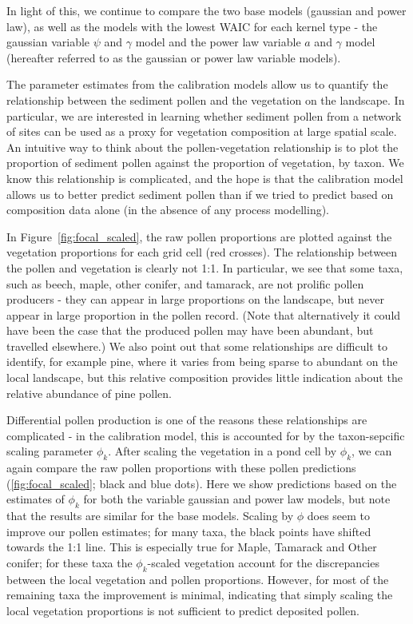 \documentclass[12pt]{article}
\begin{document}
In light of this, we continue to compare the two base models (gaussian
and power law), as well as the models with the lowest WAIC for each
kernel type - the gaussian variable $\psi$ and $\gamma$ model and the
power law variable $a$ and $\gamma$ model (hereafter referred to as
the gaussian or power law variable models).

The parameter estimates from the calibration models allow us to
quantify the relationship between the sediment pollen and the
vegetation on the landscape. In particular, we are interested in
learning whether sediment pollen from a network of sites can be used
as a proxy for vegetation composition at large spatial scale. An
intuitive way to think about the pollen-vegetation relationship is to
plot the proportion of sediment pollen against the proportion of
vegetation, by taxon. We know this relationship is complicated, and
the hope is that the calibration model allows us to better predict
sediment pollen than if we tried to predict based on composition data
alone (in the absence of any process modelling).

In Figure~\ref{fig:focal_scaled}, the raw pollen proportions are
plotted against the vegetation proportions for each grid cell (red
crosses). The relationship between the pollen and vegetation is
clearly not 1:1. In particular, we see that some taxa, such as beech,
maple, other conifer, and tamarack, are not prolific pollen producers
- they can appear in large proportions on the landscape, but never
appear in large proportion in the pollen record. (Note that
alternatively it could have been the case that the produced pollen may
have been abundant, but travelled elsewhere.) We also point out that
some relationships are difficult to identify, for example pine, where
it varies from being sparse to abundant on the local landscape, but
this relative composition provides little indication about the
relative abundance of pine pollen.

Differential pollen production is one of the reasons these
relationships are complicated - in the calibration model, this is
accounted for by the taxon-sepcific scaling parameter $\phi_k$. After
scaling the vegetation in a pond cell by $\phi_k$, we can again
compare the raw pollen proportions with these pollen predictions
(\ref{fig:focal_scaled}; black and blue dots). Here we show
predictions based on the estimates of $\phi_k$ for both the variable
gaussian and power law models, but note that the results are similar
for the base models. Scaling by $\phi$ does seem to improve our pollen
estimates; for many taxa, the black points have shifted towards the
1:1 line. This is especially true for Maple, Tamarack and Other
conifer; for these taxa the $\phi_k$-scaled vegetation account for the
discrepancies between the local vegetation and pollen
proportions. However, for most of the remaining taxa the improvement
is minimal, indicating that simply scaling the local vegetation
proportions is not sufficient to predict deposited pollen.
\end{document}

